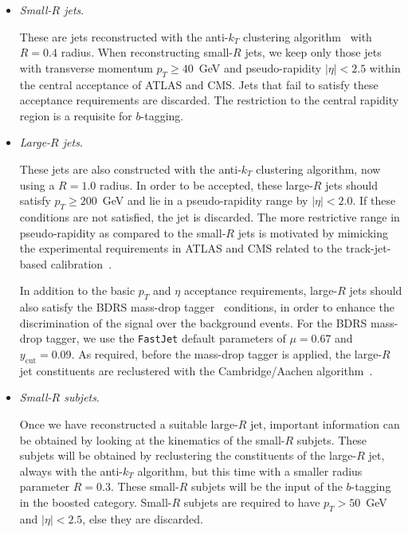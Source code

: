 \begin{itemize}
\item {\it Small-$R$ jets}.

  These are jets  reconstructed with the
  anti-$k_T$ clustering algorithm~\cite{Cacciari:2008gp} with $R=0.4$ radius.
  When reconstructing small-$R$ jets, we keep only
  those jets with transverse momentum $p_T \ge 40$~GeV
  and pseudo-rapidity $|\eta|<2.5$ within the central
  acceptance of ATLAS and CMS.
%
  Jets that fail to satisfy these acceptance
  requirements are discarded.
  The restriction to the central rapidity region is a
  requisite for $b$-tagging.
    

\item {\it Large-$R$ jets}.

  These jets are also constructed with the
  anti-$k_T$ clustering algorithm, now using a $R=1.0$ radius.
  In order to be accepted, these large-$R$ jets should
  satisfy  $p_T \ge 200$~GeV and lie in a pseudo-rapidity range by
  $|\eta|<2.0$.
  If these conditions are not satisfied, the jet is discarded.
  The more restrictive range  in pseudo-rapidity
  as compared to the small-$R$ jets
  is motivated by mimicking the  experimental requirements
  in ATLAS and CMS
  related to the track-jet-based calibration~\cite{Aad:2014bia,ATLAS:2012kla}.

  In addition to the basic $p_T$ and $\eta$
  acceptance requirements, large-$R$ jets should also
  satisfy the  BDRS mass-drop tagger~\cite{Butterworth:2008iy}
  conditions, in order
  to enhance the discrimination of the signal over the background
  events.
  For the BDRS mass-drop tagger, we use the {\tt FastJet} default
  parameters of  $\mu = 0.67$ and $y_{\textrm{cut}}= 0.09$.
  As required, before the mass-drop tagger is applied, the large-$R$ jet
  constituents are reclustered with the Cambridge/Aachen
  algorithm~\cite{Dokshitzer:1997in,Wobisch:1998wt}.

  
\item {\it Small-$R$ subjets}.

  Once we have reconstructed a suitable large-$R$ jet, important
  information can be obtained by looking at the kinematics of
  the small-$R$ subjets.
  These subjets will be obtained by reclustering the constituents
  of the large-$R$ jet, always with the  anti-$k_T$ algorithm,
  but this time with a smaller radius parameter $R=0.3$.
  These small-$R$ subjets will be the input of
  the $b$-tagging in the boosted category.
  Small-$R$ subjets are required to have $p_T > 50$~GeV and $|\eta|<2.5$,
  else they are discarded.
\end{itemize}

